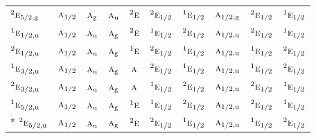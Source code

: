 \documentclass[10pt,a4paper]{article}
\numberwithin{equation}{section}
\newcommand{\irr}[1]{\text{\normalfont\scshape #1}}
\newcommand{\conjpair}[1]{{}^{#1}}
\newcommand{\ptag}[1]{\mathrm{#1}}
\begin{document}
{\begin{longtable}{@{}lccccccccc@{}}
$\conjpair{2}\irr{e}_{5/2,\ptag{g}}$ & $\irr{a}_{1/2}$ & $\irr{a}_{\ptag{g}}$ & $\irr{a}_{\ptag{u}}$ & $\conjpair{2}\irr{e}$ & $\conjpair{2}\irr{e}_{1/2}$ & $\conjpair{1}\irr{e}_{1/2}$ & $\irr{a}_{1/2,\ptag{g}}$ & $\conjpair{2}\irr{e}_{1/2}$ & $\conjpair{1}\irr{e}_{1/2}$\\
$\conjpair{1}\irr{e}_{1/2,\ptag{u}}$ & $\irr{a}_{1/2}$ & $\irr{a}_{\ptag{u}}$ & $\irr{a}_{\ptag{g}}$ & $\conjpair{2}\irr{e}$ & $\conjpair{1}\irr{e}_{1/2}$ & $\conjpair{2}\irr{e}_{1/2}$ & $\irr{a}_{1/2,\ptag{u}}$ & $\conjpair{2}\irr{e}_{1/2}$ & $\conjpair{1}\irr{e}_{1/2}$\\
$\conjpair{2}\irr{e}_{1/2,\ptag{u}}$ & $\irr{a}_{1/2}$ & $\irr{a}_{\ptag{u}}$ & $\irr{a}_{\ptag{g}}$ & $\conjpair{1}\irr{e}$ & $\conjpair{2}\irr{e}_{1/2}$ & $\conjpair{1}\irr{e}_{1/2}$ & $\irr{a}_{1/2,\ptag{u}}$ & $\conjpair{1}\irr{e}_{1/2}$ & $\conjpair{2}\irr{e}_{1/2}$\\
$\conjpair{1}\irr{e}_{3/2,\ptag{u}}$ & $\irr{a}_{1/2}$ & $\irr{a}_{\ptag{u}}$ & $\irr{a}_{\ptag{g}}$ & $\irr{a}$ & $\conjpair{2}\irr{e}_{1/2}$ & $\conjpair{1}\irr{e}_{1/2}$ & $\irr{a}_{1/2,\ptag{u}}$ & $\conjpair{1}\irr{e}_{1/2}$ & $\conjpair{2}\irr{e}_{1/2}$\\
$\conjpair{2}\irr{e}_{3/2,\ptag{u}}$ & $\irr{a}_{1/2}$ & $\irr{a}_{\ptag{u}}$ & $\irr{a}_{\ptag{g}}$ & $\irr{a}$ & $\conjpair{1}\irr{e}_{1/2}$ & $\conjpair{2}\irr{e}_{1/2}$ & $\irr{a}_{1/2,\ptag{u}}$ & $\conjpair{2}\irr{e}_{1/2}$ & $\conjpair{1}\irr{e}_{1/2}$\\
$\conjpair{1}\irr{e}_{5/2,\ptag{u}}$ & $\irr{a}_{1/2}$ & $\irr{a}_{\ptag{u}}$ & $\irr{a}_{\ptag{g}}$ & $\conjpair{1}\irr{e}$ & $\conjpair{1}\irr{e}_{1/2}$ & $\conjpair{2}\irr{e}_{1/2}$ & $\irr{a}_{1/2,\ptag{u}}$ & $\conjpair{2}\irr{e}_{1/2}$ & $\conjpair{1}\irr{e}_{1/2}$\\*
$\conjpair{2}\irr{e}_{5/2,\ptag{u}}$ & $\irr{a}_{1/2}$ & $\irr{a}_{\ptag{u}}$ & $\irr{a}_{\ptag{g}}$ & $\conjpair{2}\irr{e}$ & $\conjpair{2}\irr{e}_{1/2}$ & $\conjpair{1}\irr{e}_{1/2}$ & $\irr{a}_{1/2,\ptag{u}}$ & $\conjpair{1}\irr{e}_{1/2}$ & $\conjpair{2}\irr{e}_{1/2}$\\
\bottomrule\end{longtable}}
\end{document}

